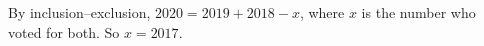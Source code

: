 By inclusion--exclusion, $2020=2019+2018-x$, where $x$ is the number who voted for both. So $x=\boxed{2017}$.

